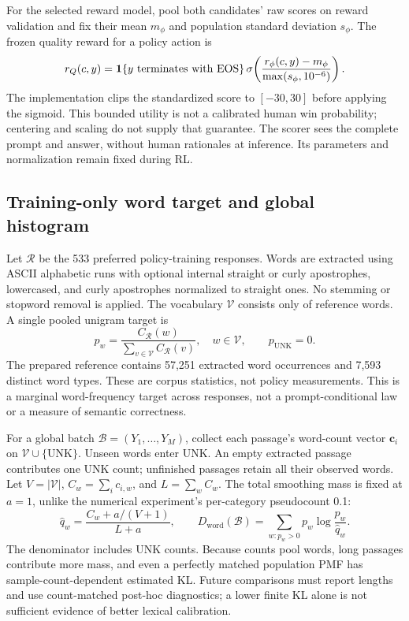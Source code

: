 For the selected reward model, pool both candidates' raw scores on reward
validation and fix their mean $m_\phi$ and population standard deviation
$s_\phi$. The frozen quality reward for a policy action is
\begin{equation}
 r_Q(c,y)=\mathbf{1}\{y\text{ terminates with EOS}\}\,
 \sigma\!\left(\frac{r_\phi(c,y)-m_\phi}{\max(s_\phi,10^{-6})}\right).
 \label{eq:qualitytransform}
\end{equation}
The implementation clips the standardized score to $[-30,30]$ before
applying the sigmoid. This bounded utility is not a calibrated human
win probability; centering and scaling do not supply that guarantee.
The scorer sees the complete prompt and answer, without human rationales
at inference. Its parameters and normalization remain fixed during RL.

\subsection{Training-only word target and global histogram}
Let $\mathcal R$ be the 533 preferred policy-training responses. Words
are extracted using ASCII alphabetic runs with optional internal straight
or curly apostrophes, lowercased, and curly apostrophes normalized to
straight ones. No stemming or stopword removal is applied. The vocabulary
$\mathcal V$ consists only of reference words. A single pooled unigram
target is
\begin{equation}
 p_w=\frac{C_{\mathcal R}(w)}{\sum_{v\in\mathcal V}C_{\mathcal R}(v)},
 \quad w\in\mathcal V,\qquad p_{\mathrm{UNK}}=0.
 \label{eq:wordtarget}
\end{equation}
The prepared reference contains 57,251 extracted word occurrences and
7,593 distinct word types. These are corpus statistics, not policy
measurements. This is a marginal word-frequency target across responses, not a
prompt-conditional law or a measure of semantic correctness.

For a global batch $\mathcal B=(Y_1,\ldots,Y_M)$, collect each passage's
word-count vector $\mathbf c_i$ on $\mathcal V\cup\{\mathrm{UNK}\}$.
Unseen words enter UNK. An empty extracted passage contributes one UNK
count; unfinished passages retain all their observed words. Let
$V=|\mathcal V|$, $C_w=\sum_i c_{i,w}$, and $L=\sum_w C_w$. The
total smoothing mass is fixed at $a=1$, unlike the numerical experiment's
per-category pseudocount 0.1:
\begin{equation}
 \widehat q_w=\frac{C_w+a/(V+1)}{L+a},\qquad
 D_{\mathrm{word}}(\mathcal B)=
 \sum_{w:p_w>0}p_w\log\frac{p_w}{\widehat q_w}.
 \label{eq:wordkl}
\end{equation}
The denominator includes UNK counts. Because counts pool words, long
passages contribute more mass, and even a perfectly matched population
PMF has sample-count-dependent estimated KL. Future comparisons must
report lengths and use count-matched post-hoc diagnostics; a lower finite
KL alone is not sufficient evidence of better lexical calibration.

